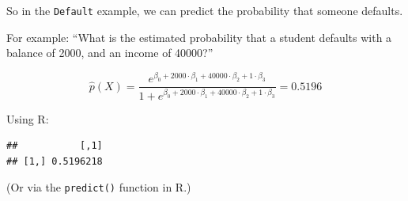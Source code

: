 \documentclass[
  10pt,
  ignorenonframetext,
]{beamer}
\newenvironment{Shaded}{\begin{snugshade}}{\end{snugshade}}
\newcommand{\DecValTok}[1]{\textcolor[rgb]{0.00,0.00,0.81}{#1}}
\newcommand{\FunctionTok}[1]{\textcolor[rgb]{0.13,0.29,0.53}{\textbf{#1}}}
\newcommand{\NormalTok}[1]{#1}
\newcommand{\OtherTok}[1]{\textcolor[rgb]{0.56,0.35,0.01}{#1}}
\newcommand{\SpecialCharTok}[1]{\textcolor[rgb]{0.81,0.36,0.00}{\textbf{#1}}}
\begin{document}
\begin{frame}[fragile]
So in the \texttt{Default} example, we can predict the probability that
someone defaults.

For example: ``What is the estimated probability that a student defaults
with a balance of 2000, and an income of 40000?''

\[\hat{p}(X) = \frac{e^{\beta_0 + 2000 \cdot \beta_1 + 40000 \cdot \beta_2 + 1 \cdot \beta_3}}{ 1+  e^{\beta_0 + 2000 \cdot \beta_1 + 40000 \cdot \beta_2 + 1 \cdot \beta_3}} = 0.5196\]
\vspace{6mm}

Using R: \scriptsize

\begin{Shaded}
\end{Shaded}

\begin{verbatim}
##           [,1]
## [1,] 0.5196218
\end{verbatim}

\normalsize

(Or via the \texttt{predict()} function in R.)
\end{frame}
\end{document}
